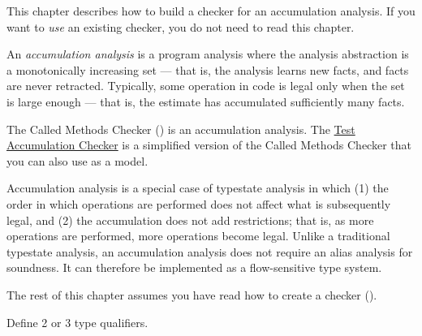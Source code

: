 \htmlhr
{}


This chapter describes how to build a checker for an accumulation analysis.
If you want to \emph{use} an existing checker, you do not need to read this chapter.

An \emph{accumulation analysis} is a program analysis where the
analysis abstraction is a monotonically increasing set --- that is, the
analysis learns new facts, and facts are never retracted.
Typically, some operation in code is legal
only when the set is large enough --- that is, the estimate has accumulated
sufficiently many facts.

The Called Methods Checker ()
is an accumulation analysis.
The
\href{https://github.com/typetools/checker-framework/blob/master/framework/src/test/java/org/checkerframework/framework/testchecker/testaccumulation/TestAccumulationChecker.java}{Test Accumulation Checker}
is a simplified version of the Called Methods Checker that you can also use as a model.

Accumulation analysis is a special case of typestate analysis in which
(1) the order in which operations are performed does not affect what is subsequently legal,
and (2) the accumulation does not add restrictions; that is, as
more operations are performed, more operations become legal.
Unlike a traditional typestate analysis, an accumulation analysis does
not require an alias analysis for soundness. It can therefore be implemented
as a flow-sensitive type system.

The rest of this chapter assumes you have read how to create a checker
().


Define 2 or 3 type qualifiers.

